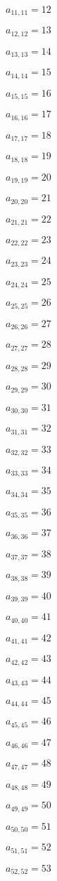 \documentclass[a4paper,12pt]{article}
\begin{document}
$a _{ 11, 11 } = 12$

$a _{ 12, 12 } = 13$

$a _{ 13, 13 } = 14$

$a _{ 14, 14 } = 15$

$a _{ 15, 15 } = 16$

$a _{ 16, 16 } = 17$

$a _{ 17, 17 } = 18$

$a _{ 18, 18 } = 19$

$a _{ 19, 19 } = 20$

$a _{ 20, 20 } = 21$

$a _{ 21, 21 } = 22$

$a _{ 22, 22 } = 23$

$a _{ 23, 23 } = 24$

$a _{ 24, 24 } = 25$

$a _{ 25, 25 } = 26$

$a _{ 26, 26 } = 27$

$a _{ 27, 27 } = 28$

$a _{ 28, 28 } = 29$

$a _{ 29, 29 } = 30$

$a _{ 30, 30 } = 31$

$a _{ 31, 31 } = 32$

$a _{ 32, 32 } = 33$

$a _{ 33, 33 } = 34$

$a _{ 34, 34 } = 35$

$a _{ 35, 35 } = 36$

$a _{ 36, 36 } = 37$

$a _{ 37, 37 } = 38$

$a _{ 38, 38 } = 39$

$a _{ 39, 39 } = 40$

$a _{ 40, 40 } = 41$

$a _{ 41, 41 } = 42$

$a _{ 42, 42 } = 43$

$a _{ 43, 43 } = 44$

$a _{ 44, 44 } = 45$

$a _{ 45, 45 } = 46$

$a _{ 46, 46 } = 47$

$a _{ 47, 47 } = 48$

$a _{ 48, 48 } = 49$

$a _{ 49, 49 } = 50$

$a _{ 50, 50 } = 51$

$a _{ 51, 51 } = 52$

$a _{ 52, 52 } = 53$
\end{document}
